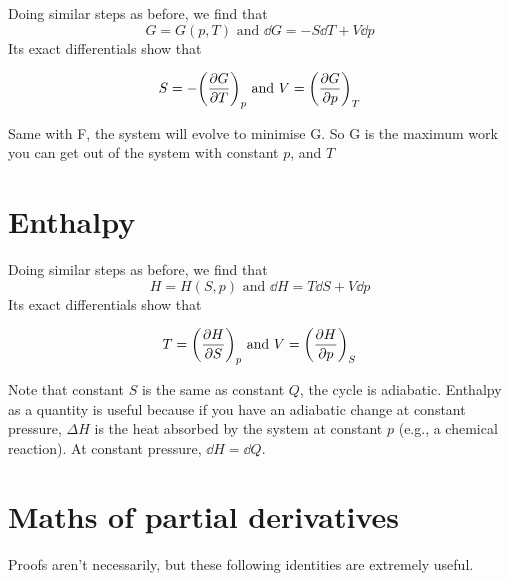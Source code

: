 \documentclass[12pt,chapterprefix=false,dvipsnames]{scrbook}
\theoremstyle{dotless}
\theoremstyle{definition}
\begin{document}
Doing similar steps as before, we find that
\begin{equation}
	\label{eq:gibbs_free_energy}
	G = G(p,T)\,\, \text{and} \,\,
	\dd{G} = -S\dd{T} +
	V\dd{p}
\end{equation}
Its exact differentials show that

\begin{equation}
	S = -{\left(\pdv{G}{T}\right)}_p\,\, \text{and}\,\,
	V = {\left(\pdv{G}{p}\right)}_T
\end{equation}

Same with F, the system will evolve to minimise G. So G is the
maximum work you can get out of the system with constant
$p$, and $T$

\section{Enthalpy}%
\label{sec:enthalpy}

Doing similar steps as before, we find that
\begin{equation}
	H = H(S,p)\,\, \text{and} \,\,
	\dd{H} = T\dd{S} +
	V\dd{p}
\end{equation}
Its exact differentials show that

\begin{equation}
	T = {\left(\pdv{H}{S}\right)}_p\,\, \text{and}\,\,
	V = {\left(\pdv{H}{p}\right)}_S
\end{equation}

Note that constant $S$ is the same as
constant $Q$, the cycle is adiabatic.
Enthalpy as a quantity is useful because if you have an
adiabatic change at constant pressure, $\Delta H$
is the heat absorbed by the system at constant
$p$ (e.g., a chemical reaction). At constant
pressure, $\dd{H} = \dd{Q}$.

\section{Maths of partial derivatives}%
\label{sec:maths_of_partial_derivatives}

Proofs aren't necessarily, but these following identities are
extremely useful.
\end{document}
